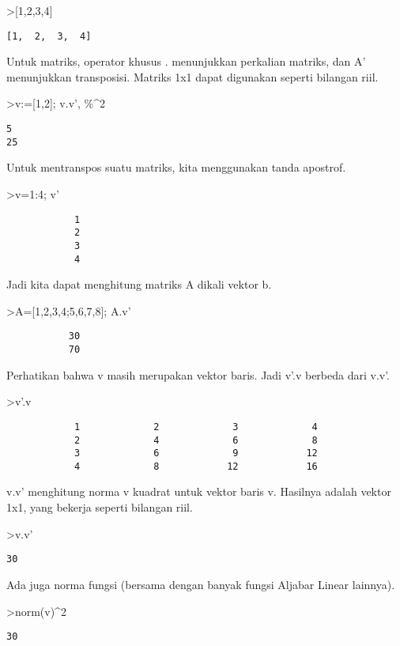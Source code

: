 \documentclass[
]{book}
\begin{document}
\textgreater{[}1,2,3,4{]}

\begin{verbatim}
[1,  2,  3,  4]
\end{verbatim}

Untuk matriks, operator khusus . menunjukkan perkalian matriks, dan A' menunjukkan transposisi. Matriks 1x1 dapat digunakan seperti bilangan riil.

\textgreater v:={[}1,2{]}; v.v', \%\^{}2

\begin{verbatim}
5
25
\end{verbatim}

Untuk mentranspos suatu matriks, kita menggunakan tanda apostrof.

\textgreater v=1:4; v'

\begin{verbatim}
            1 
            2 
            3 
            4 
\end{verbatim}

Jadi kita dapat menghitung matriks A dikali vektor b.

\textgreater A={[}1,2,3,4;5,6,7,8{]}; A.v'

\begin{verbatim}
           30 
           70 
\end{verbatim}

Perhatikan bahwa v masih merupakan vektor baris. Jadi v'.v berbeda dari v.v'.

\textgreater v'.v

\begin{verbatim}
            1             2             3             4 
            2             4             6             8 
            3             6             9            12 
            4             8            12            16 
\end{verbatim}

v.v' menghitung norma v kuadrat untuk vektor baris v. Hasilnya adalah vektor 1x1, yang bekerja seperti bilangan riil.

\textgreater v.v'

\begin{verbatim}
30
\end{verbatim}

Ada juga norma fungsi (bersama dengan banyak fungsi Aljabar Linear lainnya).

\textgreater norm(v)\^{}2

\begin{verbatim}
30
\end{verbatim}
\end{document}
